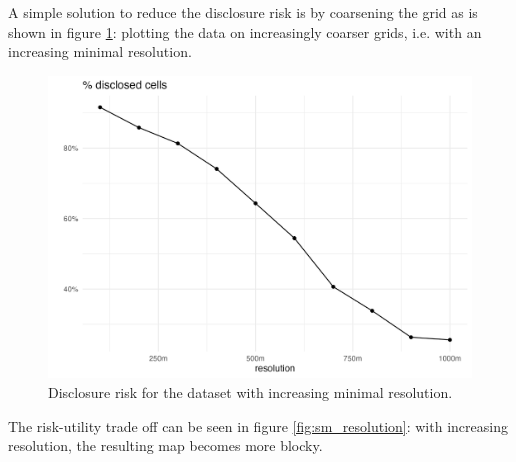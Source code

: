 A simple solution to reduce the disclosure risk is by coarsening the grid as 
is shown in figure \ref{fig:sm_resolution_dep}: plotting the data 
on increasingly coarser grids, i.e. with an increasing minimal resolution.

\begin{figure}[H]
    \centering
    \includegraphics[width=.8\linewidth]{figures/Smoothing/sensitive_res.png}
    \caption{Disclosure risk for the dataset with increasing minimal resolution.}
    \label{fig:sm_resolution_dep}
\end{figure}

The risk-utility trade off can be seen in figure \ref{fig:sm_resolution}:
with increasing resolution, the resulting map becomes more blocky.

